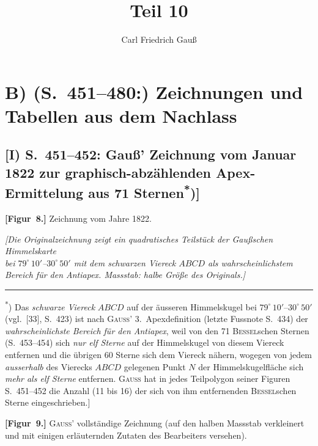 \documentclass[12pt,a4paper]{article}
\title{Teil 10}
\author{Carl Friedrich Gau\ss}
\date{}
\theoremstyle{plain}
\theoremstyle{definition}
\theoremstyle{remark}
\begin{document}
\maketitle

\section*{B) (S.~451--480:) Zeichnungen und Tabellen aus dem Nachlass}

\subsection*{[I) S.~451--452: Gau\ss' Zeichnung vom Januar 1822 zur graphisch-abz\"ahlenden Apex-Ermittelung aus 71 Sternen\textsuperscript{*})]}

\noindent\textbf{[Figur~8.]} Zeichnung vom Jahre 1822.

\medskip
\begin{center}
\textit{[Die Originalzeichnung zeigt ein quadratisches Teilst\"uck der Gau\ss schen Himmelskarte\\
bei $79^{\circ}\,10'$--$30^{\circ}\,50'$ mit dem schwarzen Viereck $ABCD$ als wahrscheinlichstem\\
Bereich f\"ur den Antiapex. Massstab: halbe Gr\"o\ss e des Originals.]}
\end{center}
\medskip

\noindent\rule{\textwidth}{0.4pt}
\begin{small}
\textsuperscript{*}) Das \textit{schwarze Viereck} $ABCD$ auf der \"ausseren Himmelskugel bei
$79^{\circ}\,10'$--$30^{\circ}\,50'$ (vgl.~[33], S.~423) ist nach \textsc{Gau\ss'} 3.~Apexdefinition
(letzte Fussnote S.~434) der \textit{wahrscheinlichste Bereich f\"ur den Antiapex}, weil
von den 71 \textsc{Bessel}schen Sternen (S.~453--454) sich \textit{nur elf Sterne} auf der
Himmelskugel von diesem Viereck entfernen und die \"ubrigen 60 Sterne sich dem
Viereck n\"ahern, wogegen von jedem \textit{ausserhalb} des Vierecks $ABCD$ gelegenen
Punkt $N$ der Himmelskugelfl\"ache sich \textit{mehr als elf Sterne} entfernen. \textsc{Gau\ss}
hat in jedes Teilpolygon seiner Figuren S.~451--452 die Anzahl (11 bis 16) der
sich von ihm entfernenden \textsc{Bessel}schen Sterne eingeschrieben.]
\end{small}
\medskip

\noindent\textbf{[Figur~9.]} \textsc{Gau\ss'} vollst\"andige Zeichnung (auf den halben Massstab verkleinert
und mit einigen erl\"auternden Zutaten des Bearbeiters versehen).
\end{document}
